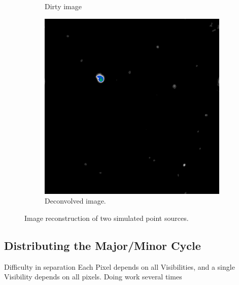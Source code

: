 \begin{figure}[h]
\begin{subfigure}[b]{0.3\linewidth}
		\caption{Dirty image}
		\label{results:points:tclean}
	\end{subfigure}
	\begin{subfigure}[b]{0.3\linewidth}
		\includegraphics[width=\linewidth]{./chapters/01.intro/mk2/clean.png}
		\caption{Deconvolved image.}
		\label{results:points:tclean}
	\end{subfigure}
	
	
	\caption{Image reconstruction of two simulated point sources.}
	\label{results:points}
\end{figure}


\subsection{Distributing the Major/Minor Cycle}

Difficulty in separation
Each Pixel depends on all Visibilities, and a single Visibility depends on all pixels.
Doing work several times








